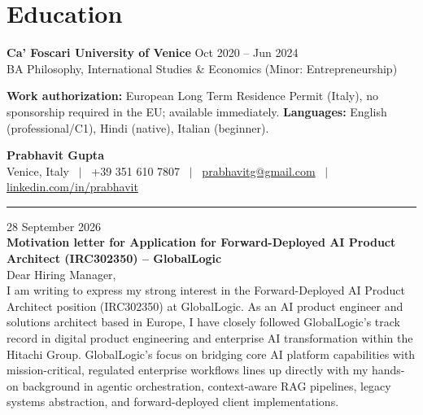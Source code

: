 \documentclass[a4paper,10pt]{article}
\begin{document}
\section{Education}
\textbf{Ca' Foscari University of Venice} \hfill Oct 2020 -- Jun 2024\\
BA Philosophy, International Studies \& Economics (Minor: Entrepreneurship)

\vspace{2pt}
{\small \textbf{Work authorization:} European Long Term Residence Permit (Italy), no sponsorship required in the EU; available immediately. \quad \textbf{Languages:} English (professional/C1), Hindi (native), Italian (beginner).}

\clearpage

\begin{minipage}[c]{\textwidth}
{\large\bfseries Prabhavit Gupta}\\[2pt]
{\footnotesize Venice, Italy ~$\vert$~ +39 351 610 7807 ~$\vert$~
\href{mailto:prabhavitg@gmail.com}{prabhavitg@gmail.com} ~$\vert$~
\href{https://www.linkedin.com/in/prabhavit/}{linkedin.com/in/prabhavit}}\\[-2pt]
\rule{\textwidth}{0.8pt}
\end{minipage}
\vspace{10pt}

28 September 2026\\[10pt]

\textbf{Motivation letter for Application for Forward-Deployed AI Product Architect (IRC302350) -- GlobalLogic}\\[8pt]

Dear Hiring Manager,\\[6pt]

I am writing to express my strong interest in the Forward-Deployed AI Product Architect position (IRC302350) at GlobalLogic. As an AI product engineer and solutions architect based in Europe, I have closely followed GlobalLogic's track record in digital product engineering and enterprise AI transformation within the Hitachi Group. GlobalLogic's focus on bridging core AI platform capabilities with mission-critical, regulated enterprise workflows lines up directly with my hands-on background in agentic orchestration, context-aware RAG pipelines, legacy systems abstraction, and forward-deployed client implementations.\\[6pt]
\end{document}
